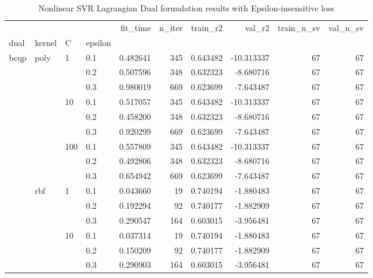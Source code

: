 \begin{table}[h!]
\centering
\caption{Nonlinear SVR Lagrangian Dual formulation results with Epsilon-insensitive loss}
\label{nonlinear_lagrangian_dual_svr_cv_results}
\begin{tabular}{llllrrrrrr}
\toprule
   &     &     &     &  fit\_time &  n\_iter &  train\_r2 &     val\_r2 &  train\_n\_sv &  val\_n\_sv \\
dual & kernel & C & epsilon &           &         &           &            &             &           \\
\midrule
bcqp & poly & 1   & 0.1 &  0.482641 &     345 &  0.643482 & -10.313337 &          67 &        67 \\
   &     &     & 0.2 &  0.507596 &     348 &  0.632323 &  -8.680716 &          67 &        67 \\
   &     &     & 0.3 &  0.980019 &     669 &  0.623699 &  -7.643487 &          67 &        67 \\
   &     & 10  & 0.1 &  0.517057 &     345 &  0.643482 & -10.313337 &          67 &        67 \\
   &     &     & 0.2 &  0.458200 &     348 &  0.632323 &  -8.680716 &          67 &        67 \\
   &     &     & 0.3 &  0.920299 &     669 &  0.623699 &  -7.643487 &          67 &        67 \\
   &     & 100 & 0.1 &  0.557809 &     345 &  0.643482 & -10.313337 &          67 &        67 \\
   &     &     & 0.2 &  0.492806 &     348 &  0.632323 &  -8.680716 &          67 &        67 \\
   &     &     & 0.3 &  0.654942 &     669 &  0.623699 &  -7.643487 &          67 &        67 \\
   & rbf & 1   & 0.1 &  0.043660 &      19 &  0.740194 &  -1.880483 &          67 &        67 \\
   &     &     & 0.2 &  0.192294 &      92 &  0.740177 &  -1.882909 &          67 &        67 \\
   &     &     & 0.3 &  0.290547 &     164 &  0.603015 &  -3.956481 &          67 &        67 \\
   &     & 10  & 0.1 &  0.037314 &      19 &  0.740194 &  -1.880483 &          67 &        67 \\
   &     &     & 0.2 &  0.150209 &      92 &  0.740177 &  -1.882909 &          67 &        67 \\
   &     &     & 0.3 &  0.290903 &     164 &  0.603015 &  -3.956481 &          67 &        67 \\

\end{tabular}
\end{table}
